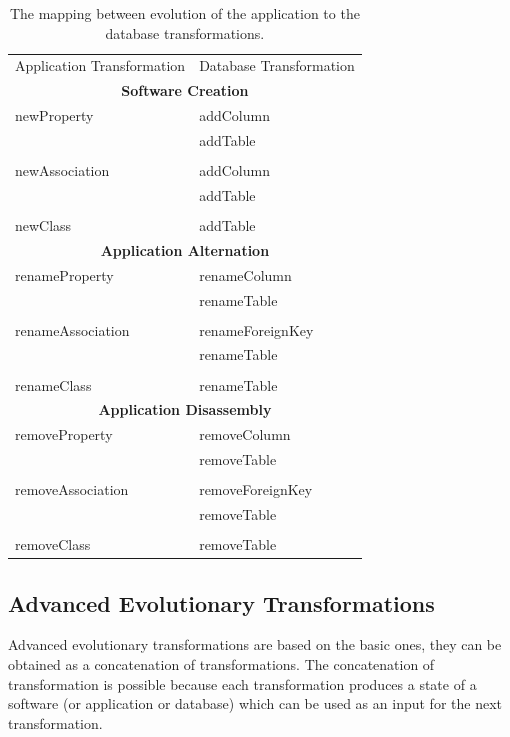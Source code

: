 \documentclass[11pt]{article}
\begin{document}
\begin{table}
\centering
	\begin{tabular}{|p{} p{}|}
	\hline
	Application Transformation & Database Transformation \\
	\multicolumn{2}{|c|}{\textbf{Software Creation}} \\
	newProperty & addColumn \\
	& addTable \\ 
	& \\
	newAssociation & addColumn \\
	& addTable \\
	& \\
	newClass & addTable \\
	\multicolumn{2}{|c|}{\textbf{Application Alternation}} \\
	renameProperty & renameColumn \\
	& renameTable \\
	& \\
	renameAssociation & renameForeignKey \\
	& renameTable \\
	& \\
	renameClass & renameTable \\
	\multicolumn{2}{|c|}{\textbf{Application Disassembly}} \\
	removeProperty & removeColumn \\
	& removeTable \\
	& \\
	removeAssociation & removeForeignKey \\
	& removeTable \\
	& \\
	removeClass & removeTable\\
	\hline
	\end{tabular}
	\caption{The mapping between evolution of the application to the database transformations.}
	\label{tab:sw-basic-evolution}
\end{table}


\subsection{Advanced Evolutionary Transformations}
Advanced evolutionary transformations are based on the basic ones, they can be obtained as a concatenation of transformations. The concatenation of transformation is possible because each transformation produces a state of a software (or application or database) which can be used as an input for the next transformation. 
\end{document}
